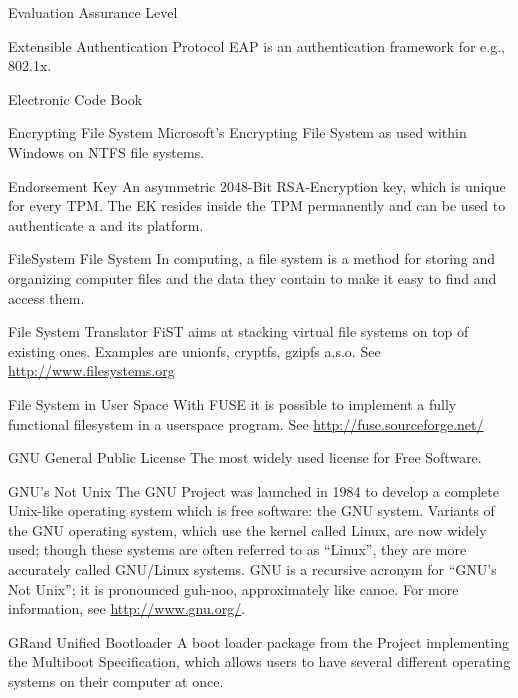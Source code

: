     {Evaluation Assurance Level}

    {Extensible Authentication Protocol}
    {EAP is an authentication framework for e.g., 802.1x.}

    {Electronic Code Book}

    {Encrypting File System}
    {Microsoft's Encrypting File System as used within Windows on NTFS file systems.}


    {Endorsement Key}
    {An asymmetric 2048-Bit RSA-Encryption key, which is unique for every TPM. 
    The EK resides inside the TPM permanently and can be used to authenticate a \TPM and its platform.}

\glosentry
    {FileSystem}
    {File System}
    {In computing, a file system is a method for storing and organizing computer files and the data they contain to make it easy to find and access them.}

    {File System Translator}
    {FiST aims at stacking virtual file systems on top of existing ones. Examples are unionfs, cryptfs, gzipfs a.s.o.
     See \url{http://www.filesystems.org}}

    {File System in User Space}
    {With FUSE it is possible to implement a fully functional filesystem in a userspace program. See \url{http://fuse.sourceforge.net/}}


    {GNU General Public License}
    {The most widely used license for Free Software.}

    {GNU's Not Unix}
    {The GNU Project was launched in 1984 to develop a complete Unix-like
operating system which is free software: the GNU system. Variants of the GNU
operating system, which use the kernel called Linux, are now widely used; though
these systems are often referred to as ``Linux'', they are more accurately
called GNU/Linux systems. GNU is a recursive acronym for ``GNU's Not
Unix''; it is pronounced guh-noo, approximately like canoe. For more
information, see \url{http://www.gnu.org/}.}
	
    {GRand Unified Bootloader}
    {A boot loader package from the \GNU Project implementing the Multiboot
Specification, which allows users to have several different operating systems on
their computer at once.}

